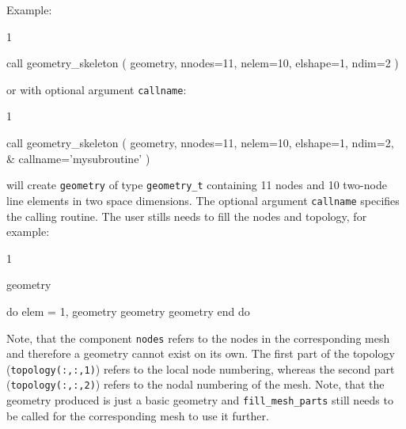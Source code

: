 Example:
\begin{listing}{1}

  call geometry_skeleton ( geometry, nnodes=11, nelem=10, elshape=1, ndim=2 )

\end{listing}
or with optional argument \texttt{callname}:
\begin{listing}{1}

  call geometry_skeleton ( geometry, nnodes=11, nelem=10, elshape=1, ndim=2, &
    callname='mysubroutine' )

\end{listing}
will create \texttt{geometry} of type \texttt{geometry\_t} containing 11 nodes and 10 two-node line elements
in two space dimensions. The optional argument \texttt{callname} specifies the calling routine. The user stills needs to fill the nodes and topology, for example:
\begin{listing}{1}

  geometry%

  do elem = 1, geometry%
    geometry%
    geometry%
  end do
  
\end{listing}
Note, that the component \texttt{nodes} refers to the nodes in the corresponding mesh and therefore a geometry cannot exist on its own. The first part of the topology (\texttt{topology(:,:,1)}) refers to the local node numbering, whereas the second part (\texttt{topology(:,:,2)}) refers to the nodal numbering of the mesh.
Note, that the geometry produced is just a basic geometry and 
\texttt{fill\_mesh\_parts} still needs to be called for the corresponding mesh to use it further.


